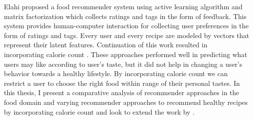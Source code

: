 \noindent Elahi proposed a food recommender system using active learning algorithm and matrix factorization \cite{16} which collects ratings and tags in the form of feedback. This system provides human-computer interaction for collecting user preferences in the form of ratings and tags. Every user and every recipe are modeled by vectors that represent their latent features. Continuation of this work resulted in incorporating calorie count \cite{18}.
These approaches performed well in predicting what users may like according to user's taste, but it did not help in changing a user's behavior towards a healthy lifestyle. By incorporating calorie count we can restrict a user to choose the right food within range of their personal tastes. In this thesis, I present a comparative analysis of recommender approaches in the food domain and varying recommender approaches to recommend healthy recipes by incorporating calorie count and look to extend the work by \cite{16,18}.